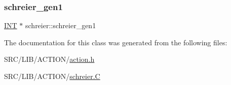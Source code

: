 \mbox{\label{classschreier_a853ca7789811354847e5f91eddb0b41f}} 
\subsubsection{\texorpdfstring{schreier\+\_\+gen1}{schreier\_gen1}}
{\footnotesize\ttfamily \mbox{\hyperlink{galois_8h_a09fddde158a3a20bd2dcadb609de11dc}{I\+NT}} $\ast$ schreier\+::schreier\+\_\+gen1}



The documentation for this class was generated from the following files\+:\begin{DoxyCompactItemize}
\item 
S\+R\+C/\+L\+I\+B/\+A\+C\+T\+I\+O\+N/\mbox{\hyperlink{action_8h}{action.\+h}}\item 
S\+R\+C/\+L\+I\+B/\+A\+C\+T\+I\+O\+N/\mbox{\hyperlink{schreier_8_c}{schreier.\+C}}\end{DoxyCompactItemize}
